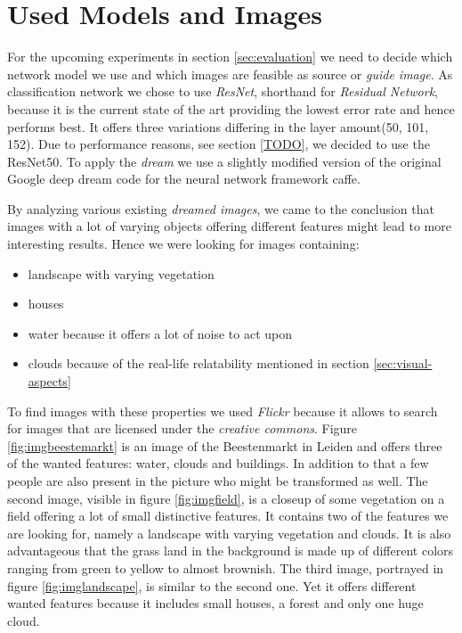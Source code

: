 \section{Used Models and Images}
\label{sec:data}
For the upcoming experiments in section \ref{sec:evaluation} we need to decide which network model we use and which images are feasible as source or \emph{guide image}.
As classification network we chose to use \emph{ResNet}\cite{he2016deep}, shorthand for \emph{Residual Network}, because it is the current state of the art providing the lowest error rate and hence performs best.\cite{cnnComparison}
It offers three variations differing in the layer amount(50, 101, 152).
Due to performance reasons, see section \ref{TODO}, we decided to use the ResNet50.
To apply the \emph{dream} we use a slightly modified version of the original Google deep dream code for the neural network framework caffe\cite{googledeepdream}.

By analyzing various existing \emph{dreamed images}, we came to the conclusion that images with a lot of varying objects offering different features might lead to more interesting results.
Hence we were looking for images containing: 
\begin{itemize}
	\item landscape with varying vegetation
	\item houses
	\item water because it offers a lot of noise to act upon
	\item clouds because of the real-life relatability mentioned in section \ref{sec:visual-aspects}
\end{itemize}

To find images with these properties we used \emph{Flickr} because it allows to search for images that are licensed under the \emph{creative commons}.
Figure \ref{fig:imgbeestemarkt} is an image of the Beestenmarkt in Leiden and offers three of the wanted features: water, clouds and buildings.
In addition to that a few people are also present in the picture who might be transformed as well.
The second image, visible in figure \ref{fig:imgfield}, is a closeup of some vegetation on a field offering a lot of small distinctive features.
It contains two of the features we are looking for, namely a landscape with varying vegetation and clouds. It is also advantageous that the grass land in the background is made up of different colors ranging from green to yellow to almost brownish.
The third image, portrayed in figure \ref{fig:imglandscape}, is similar to the second one. Yet it offers different wanted features because it includes small houses, a forest and only one huge cloud.

